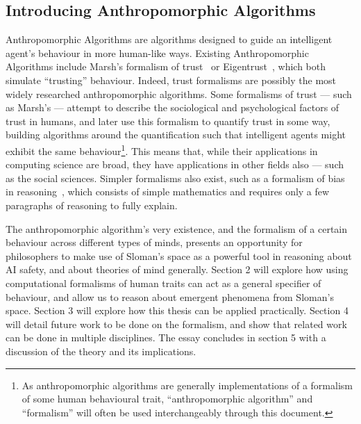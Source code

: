 \subsection{Introducing Anthropomorphic Algorithms}
Anthropomorphic Algorithms are algorithms designed to guide an intelligent agent's behaviour in more human-like ways. Existing Anthropomorphic Algorithms include Marsh's formalism of trust~\citep{Marsh1994FormalisingConcept} or Eigentrust~\citep{eigentrust}, which both simulate ``trusting'' behaviour. Indeed, trust formalisms are possibly the most widely researched anthropomorphic algorithms. Some formalisms of trust --- such as Marsh's --- attempt to describe the sociological and psychological factors of trust in humans, and later use this formalism to quantify trust in some way, building algorithms around the quantification such that intelligent agents might exhibit the same behaviour\footnote{As anthropomorphic algorithms are generally implementations of a formalism of some human behavioural trait, ``anthropomorphic algorithm'' and ``formalism'' will often be used interchangeably through this document.}. This means that, while their applications in computing science are broad, they have applications in other fields also --- such as the social sciences. Simpler formalisms also exist, such as a formalism of bias in reasoning~\cite{armstrong_bias}, which consists of simple mathematics and requires only a few paragraphs of reasoning to fully explain.\par

The anthropomorphic algorithm's very existence, and the formalism of a certain behaviour across different types of minds, presents an opportunity for philosophers to make use of Sloman's space as a powerful tool in reasoning about AI safety, and about theories of mind generally. Section 2 will explore how using computational formalisms of human traits can act as a general specifier of behaviour, and allow us to reason about emergent phenomena from Sloman's space. Section 3 will explore how this thesis can be applied practically. Section 4 will detail future work to be done on the formalism, and show that related work can be done in multiple disciplines. The essay concludes in section 5 with a discussion of the theory and its implications.\par
